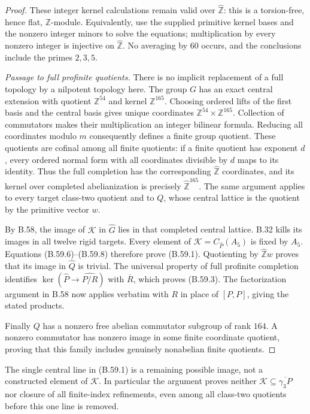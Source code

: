 \begin{proof}
These integer kernel calculations remain valid over
$\widehat{\mathbb Z}$: this is a torsion-free, hence flat,
$\mathbb Z$-module.  Equivalently, use the supplied primitive
kernel bases and the nonzero integer minors to solve the
equations; multiplication by every nonzero integer is
injective on $\widehat{\mathbb Z}$.
No averaging by $60$ occurs, and the conclusions include
the primes $2,3,5$.

\emph{Passage to full profinite quotients.}
There is no implicit replacement of a full topology by a
nilpotent topology here.  The group $G$ has an exact central
extension with quotient $\mathbb Z^{54}$ and kernel
$\mathbb Z^{165}$.  Choosing ordered lifts of the first
basis and the central basis gives unique coordinates
$\mathbb Z^{54}\times\mathbb Z^{165}$.
Collection of commutators makes their multiplication an
integer bilinear formula.  Reducing all coordinates modulo
$m$ consequently defines a finite group quotient.
These quotients are cofinal among all finite quotients:
if a finite quotient has exponent $d$, every ordered
normal form with all coordinates divisible by $d$ maps
to its identity.  Thus the full completion has the
corresponding $\widehat{\mathbb Z}$ coordinates, and its
kernel over completed abelianization is precisely
$\widehat{\mathbb Z}^{165}$.
The same argument applies to every target class-two
quotient and to $Q$, whose central lattice is the quotient
by the primitive vector $w$.

By B.58, the image of $\mathcal K$ in $\widehat G$ lies
in that completed central lattice.  B.32 kills its images
in all twelve rigid targets.  Every element of
$\mathcal K=C_{\widehat P}(A_5)$ is fixed by $A_5$.
Equations (B.59.6)--(B.59.8) therefore prove (B.59.1).
Quotienting by $\widehat{\mathbb Z}w$ proves that its image
in $\widehat Q$ is trivial.  The universal property of
full profinite completion identifies
$\ker(\widehat P\to\widehat{P/R})$ with $\overline R$,
which proves (B.59.3).
The factorization argument in B.58 now applies verbatim
with $R$ in place of $[P,P]$, giving the stated products.

Finally $Q$ has a nonzero free abelian commutator subgroup
of rank $164$.  A nonzero commutator has nonzero image in
some finite coordinate quotient, proving that this family
includes genuinely nonabelian finite quotients.
\end{proof}

The single central line in (B.59.1) is a remaining possible
image, not a constructed element of $\mathcal K$.
In particular the argument proves neither
$\mathcal K\subseteq\overline{\gamma_3P}$ nor closure of
all finite-index refinements, even among all class-two
quotients before this one line is removed.

